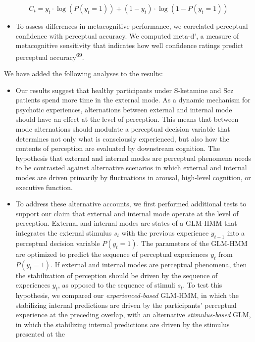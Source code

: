\documentclass[
]{article}
\providecommand{\tightlist}{%
  \setlength{\itemsep}{0pt}\setlength{\parskip}{0pt}}
\begin{document}
\[
C_t = y_t \cdot \log(P(y_t = 1)) + (1 - y_t) \cdot \log(1 - P(y_t = 1))  
\]

\begin{itemize}
\tightlist
\item
  To assess differences in metacognitive performance, we correlated
  perceptual confidence with perceptual accuracy. We computed meta-d', a
  measure of metacognitive sensitivity that indicates how well
  confidence ratings predict perceptual accuracy\textsuperscript{69}.
\end{itemize}

We have added the following analyses to the results:

\begin{itemize}
\item
  Our results suggest that healthy participants under S-ketamine and Scz
  patients spend more time in the external mode. As a dynamic mechanism
  for psychotic experiences, alternations between external and internal
  mode should have an effect at the level of perception. This means that
  between-mode alternations should modulate a perceptual decision
  variable that determines not only what is consciously experienced, but
  also how the contents of perception are evaluated by downstream
  cognition. The hypothesis that external and internal modes are
  perceptual phenomena needs to be contrasted against alternative
  scenarios in which external and internal modes are driven primarily by
  fluctuations in arousal, high-level cognition, or executive function.
\item
  To address these alternative accounts, we first performed additional
  tests to support our claim that external and internal mode operate at
  the level of perception. External and internal modes are states of a
  GLM-HMM that integrates the external stimulus \(s_t\) with the
  previous experience \(y_{t-1}\) into a perceptual decision variable
  \(P(y_t = 1)\). The parameters of the GLM-HMM are optimized to predict
  the sequence of perceptual experiences \(y_t\) from \(P(y_t = 1)\). If
  external and internal modes are perceptual phenomena, then the
  stabilization of perception should be driven by the sequence of
  experiences \(y_t\), as opposed to the sequence of stimuli \(s_t\). To
  test this hypothesis, we compared our \emph{experienced-based}
  GLM-HMM, in which the stabilizing internal predictions are driven by
  the participants' perceptual experience at the preceding overlap, with
  an alternative \emph{stimulus-based} GLM, in which the stabilizing
  internal predictions are driven by the stimulus presented at the

\end{itemize}
\end{document}
